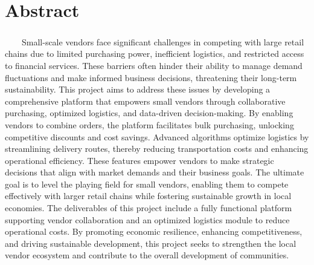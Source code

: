 \chapter*{Abstract}
\vspace{1.5cm}
\paragraph{}\ \ \ \ Small-scale vendors face significant challenges in competing with large retail chains due to limited purchasing power, inefficient logistics, and restricted access to financial services. These barriers often hinder their ability to manage demand fluctuations and make informed business decisions, threatening their long-term sustainability. This project aims to address these issues by developing a comprehensive platform that empowers small vendors through collaborative purchasing, optimized logistics, and data-driven decision-making. By enabling vendors to combine orders, the platform facilitates bulk purchasing, unlocking competitive discounts and cost savings. Advanced algorithms optimize logistics by streamlining delivery routes, thereby reducing transportation costs and enhancing operational efficiency.  These features empower vendors to make strategic decisions that align with market demands and their business goals. The ultimate goal is to level the playing field for small vendors, enabling them to compete effectively with larger retail chains while fostering sustainable growth in local economies. The deliverables of this project include a fully functional platform supporting vendor collaboration and an optimized logistics module to reduce operational costs. By promoting economic resilience, enhancing competitiveness, and driving sustainable development, this project seeks to strengthen the local vendor ecosystem and contribute to the overall development of communities.